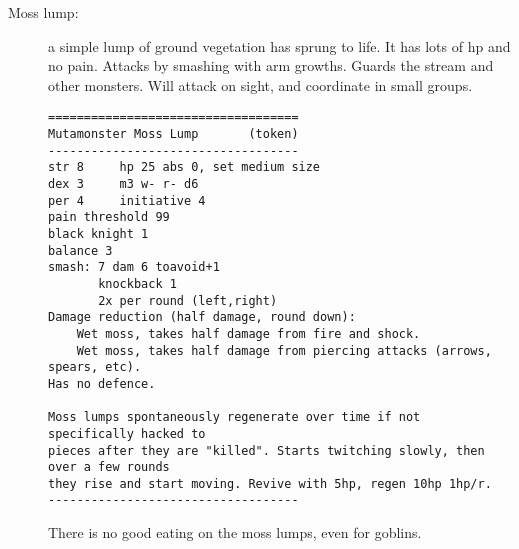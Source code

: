 \begin{description}
\item[Moss lump:] a simple lump of ground vegetation has sprung to life. It has lots of hp and no pain. Attacks by smashing with arm growths. Guards the stream and other monsters. Will attack on sight, and coordinate in small groups.
\goodbreak \begin{samepage} \small \begin{verbatim}
===================================
Mutamonster Moss Lump       (token)
-----------------------------------
str 8     hp 25 abs 0, set medium size
dex 3     m3 w- r- d6
per 4     initiative 4
pain threshold 99
black knight 1
balance 3
smash: 7 dam 6 toavoid+1
       knockback 1
       2x per round (left,right)
Damage reduction (half damage, round down):
    Wet moss, takes half damage from fire and shock.
    Wet moss, takes half damage from piercing attacks (arrows, spears, etc).
Has no defence.

Moss lumps spontaneously regenerate over time if not specifically hacked to
pieces after they are "killed". Starts twitching slowly, then over a few rounds
they rise and start moving. Revive with 5hp, regen 10hp 1hp/r.
-----------------------------------
\end{verbatim} \normalsize \end{samepage}
There is no good eating on the moss lumps, even for goblins.



\end{description}
